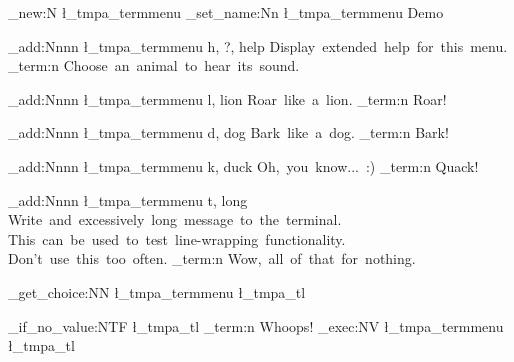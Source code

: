  \relax \ExplSyntaxOn
 \relax %

\termmenu_new:N \l_tmpa_termmenu
\termmenu_set_name:Nn \l_tmpa_termmenu { Demo }
 
\termmenu_add:Nnnn \l_tmpa_termmenu { h, ?, help }
  { Display~extended~help~for~this~menu. }
  { \msg_term:n { Choose~an~animal~to~hear~its~sound. } }
 
\termmenu_add:Nnnn \l_tmpa_termmenu { l, lion }
  { Roar~like~a~lion. }
  { \msg_term:n { Roar! } }
 
\termmenu_add:Nnnn \l_tmpa_termmenu { d, dog }
  { Bark~like~a~dog. }
  { \msg_term:n { Bark! } }
 
\termmenu_add:Nnnn \l_tmpa_termmenu { k, duck }
  { Oh,~you~know...~:) }
  { \msg_term:n { Quack! } }

\termmenu_add:Nnnn \l_tmpa_termmenu { t, long }
  {
    Write~and~excessively~long~message~to~the~terminal.~
    This~can~be~used~to~test~line-wrapping~functionality.~
    Don't~use~this~too~often.
  }
  { \msg_term:n { Wow,~all~of~that~for~nothing. } }
 
\termmenu_get_choice:NN \l_tmpa_termmenu \l_tmpa_tl

\quark_if_no_value:NTF \l_tmpa_tl
  { \msg_term:n { Whoops! } }
  { \termmenu_exec:NV \l_tmpa_termmenu \l_tmpa_tl }

\bye
